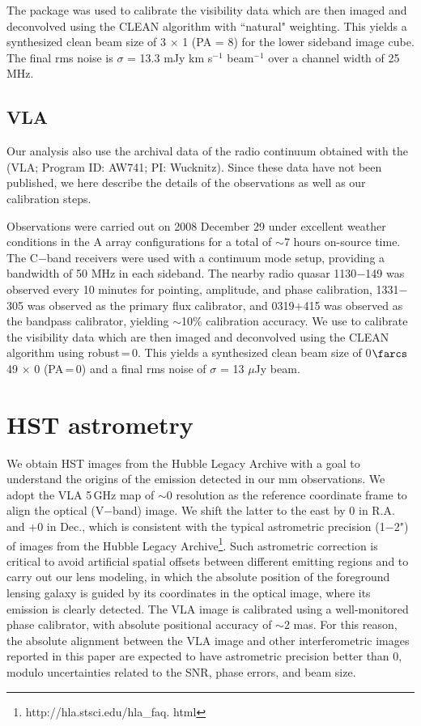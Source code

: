 \documentclass[]{emulateapj}
\begin{document}
The  package was used to calibrate the visibility data which are
then imaged and deconvolved using the CLEAN algorithm with ``natural" weighting. This yields a synthesized clean
beam size of 3 $\times$ 1 (PA = 8\degr) for the lower sideband
image cube. The final rms noise is $\sigma$ = 13.3 mJy km s$^{-1}$ beam$^{-1}$
over a channel width of 25 MHz.

\subsection{VLA} %
Our analysis also use the archival data of the radio continuum obtained with the \vla (VLA; Program ID: AW741; PI: Wucknitz). Since these data have not been
published, we here describe the details of the observations as well as our calibration steps.

Observations were carried out on 2008 December 29 under excellent weather
conditions in the A array configurations for a total of $\sim$7 hours on-source time. The C$-$band receivers were used with a continuum mode setup,
providing a bandwidth of 50 MHz in each sideband.
The nearby radio quasar 1130$-$149 was observed every 10 minutes for
pointing, amplitude, and phase calibration, 1331$-$305 was observed as the
primary flux calibrator, and 0319$+$415 was observed as the bandpass
calibrator, yielding $\sim$10\% calibration accuracy.
We use \aips to calibrate the visibility data which
are then imaged and deconvolved using
the CLEAN algorithm using robust\,=\,0. This yields a synthesized clean
beam size of 0$\farcs$49 $\times$ 0 (PA\,=\,0) and a final
rms noise of $\sigma$ = 13 $\mu$Jy beam\pmOne.


\section{HST astrometry}
We obtain HST images from the Hubble Legacy Archive with
a goal to understand the origins of the emission detected
in our mm observations. We adopt the VLA 5\,GHz map of $\sim$0
resolution as the reference coordinate frame to align the optical (V$-$band) image.
We shift the latter to the east by 0 in R.A. and $+$0 in
Dec., which is consistent with the typical astrometric precision (1$-$2") of
images from the Hubble Legacy Archive\footnote{http://hla.stsci.edu/hla\_faq.
html}. Such astrometric correction is critical to avoid artificial spatial
offsets between different emitting regions and to carry out our lens modeling,
in which the absolute position of the foreground lensing galaxy is guided by its
coordinates in the optical image, where its emission is clearly detected.
The VLA image is calibrated using a well-monitored phase
calibrator, with absolute positional accuracy of $\sim$2 mas.
For this reason, the absolute alignment between the VLA image and other
interferometric images reported in this paper are expected to have astrometric
precision better than 0, modulo uncertainties related to the SNR, phase
errors, and beam size.
\end{document}
